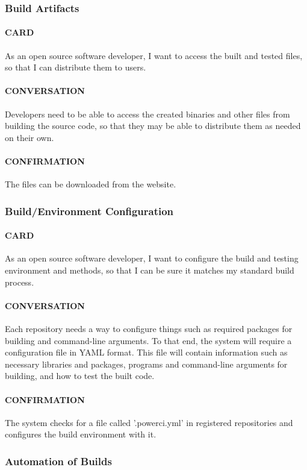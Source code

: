 \documentclass[10pt,letterpaper,onecolumn,draftclsnofoot]{IEEEtran}
\begin{document}
\subsubsection{Build Artifacts}
\paragraph{CARD}
As an open source software developer, I want to access the built and tested files, so that I can distribute them to users.
\paragraph{CONVERSATION}
Developers need to be able to access the created binaries and other files from building the source code, so that they may
be able to distribute them as needed on their own.
\paragraph{CONFIRMATION}
The files can be downloaded from the website.

\subsubsection{Build/Environment Configuration}
\paragraph{CARD}
As an open source software developer, I want to configure the build and testing environment and methods, so that I can be sure it matches my standard build process.
\paragraph{CONVERSATION}
Each repository needs a way to configure things such as required packages for building and command-line arguments.
To that end, the system will require a configuration file in YAML format. This file will contain information such as necessary
libraries and packages, programs and command-line arguments for building, and how to test the built code.
\paragraph{CONFIRMATION}
The system checks for a file called '.powerci.yml' in registered repositories and configures the build environment with it.

\subsubsection{Automation of Builds}
\end{document}
